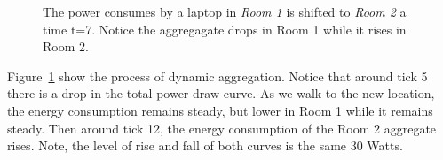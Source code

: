 \begin{figure}[htb!]
\begin{center}
\end{center}
\caption{
	The power consumes by a laptop in \emph{Room 1} is shifted to \emph{Room 2} a time t=7.  Notice the aggregagate drops in Room 1
	while it rises in Room 2.
     }%
\label{fig:multiroomagg}
\end{figure}

Figure~\ref{fig:multiroomagg} show the process of dynamic aggregation.  Notice that around tick 5 there is a drop in the total power
draw curve.  As we walk to the new location, the energy consumption remains steady, but lower in Room 1 while it remains steady.
Then around tick 12, the energy consumption of the Room 2 aggregate rises.  Note, the level of rise and fall of both curves is the same
30 Watts.



